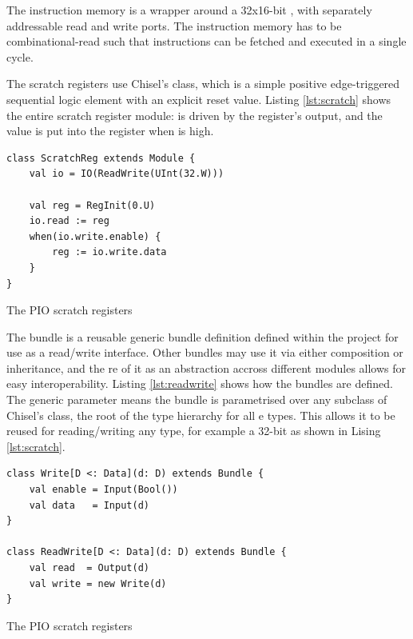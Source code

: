 The instruction memory is a wrapper around a 32x16-bit , with separately addressable read and write ports. The instruction memory has to be combinational-read such that instructions can be fetched and executed in a single cycle.

The scratch registers use Chisel's  class, which is a simple positive edge-triggered sequential logic element with an explicit reset value. Listing \ref{lst:scratch} shows the entire scratch register module:  is driven by the register's output, and the  value is put into the register when  is high.

\begin{listing}[h!]
    \vspace{0.5cm}
    \begin{verbatim}
class ScratchReg extends Module {
    val io = IO(ReadWrite(UInt(32.W)))
    
    val reg = RegInit(0.U)
    io.read := reg
    when(io.write.enable) {
        reg := io.write.data
    }
}
    \end{verbatim}
    \caption{The PIO scratch registers}
    \label{lst:scratch}
\end{listing}

The  bundle is a reusable generic bundle definition defined within the project for use as a read/write interface. Other bundles may use it via either composition or inheritance, and the re of it as an abstraction accross different modules allows for easy interoperability. Listing \ref{lst:readwrite} shows how the bundles are defined. The generic parameter  means the bundle is parametrised over any subclass of Chisel's  class, the root of the type hierarchy for all e types. This allows it to be reused for reading/writing any type, for example a 32-bit  as shown in Lising \ref{lst:scratch}.

\begin{listing}[h!]
    \vspace{0.5cm}
    \begin{verbatim}
class Write[D <: Data](d: D) extends Bundle {
    val enable = Input(Bool())
    val data   = Input(d)
}

class ReadWrite[D <: Data](d: D) extends Bundle {
    val read  = Output(d)
    val write = new Write(d)
}
    \end{verbatim}
    \caption{The PIO scratch registers}
    \label{lst:readwrite}
\end{listing}

